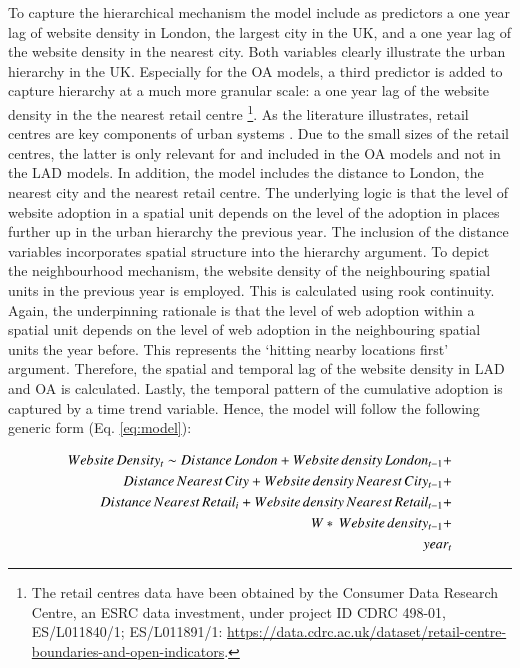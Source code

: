 \documentclass[
  authoryear,
  preprint,
  3p]{elsarticle}
\begin{document}
To capture the hierarchical mechanism the model include as predictors a
one year lag of website density in London, the largest city in the UK,
and a one year lag of the website density in the nearest city. Both
variables clearly illustrate the urban hierarchy in the UK. Especially
for the OA models, a third predictor is added to capture hierarchy at a
much more granular scale: a one year lag of the website density in the
the nearest retail centre \footnote{The retail centres data have been
  obtained by the Consumer Data Research Centre, an ESRC data
  investment, under project ID CDRC 498-01, ES/L011840/1; ES/L011891/1:
  \url{https://data.cdrc.ac.uk/dataset/retail-centre-boundaries-and-open-indicators}.}.
As the literature illustrates, retail centres are key components of
urban systems \citep{dennis2002central, jones2021reframing}. Due to the
small sizes of the retail centres, the latter is only relevant for and
included in the OA models and not in the LAD models. In addition, the
model includes the distance to London, the nearest city and the nearest
retail centre. The underlying logic is that the level of website
adoption in a spatial unit depends on the level of the adoption in
places further up in the urban hierarchy the previous year. The
inclusion of the distance variables incorporates spatial structure into
the hierarchy argument. To depict the neighbourhood mechanism, the
website density of the neighbouring spatial units in the previous year
is employed. This is calculated using rook continuity. Again, the
underpinning rationale is that the level of web adoption within a
spatial unit depends on the level of web adoption in the neighbouring
spatial units the year before. This represents the `hitting nearby
locations first' argument. Therefore, the spatial and temporal lag of
the website density in LAD and OA is calculated. Lastly, the temporal
pattern of the cumulative adoption is captured by a time trend variable.
Hence, the model will follow the following generic form (Eq.
\ref{eq:model}):

\begin{align} \label{eq:model}
Website\,Density_{t} \sim Distance\,London +
Website\,density\,London_{t-1} +\notag\\
Distance\,Nearest\,City +
Website\,density\,Nearest\,City_{t-1} +\notag\\
Distance\,Nearest\,Retail_{i} +
Website\,density\,Nearest\,Retail_{t-1} +\notag\\
W*\, Website\,density_{t-1} +\notag\\ 
year_{t}
\end{align}
\end{document}
